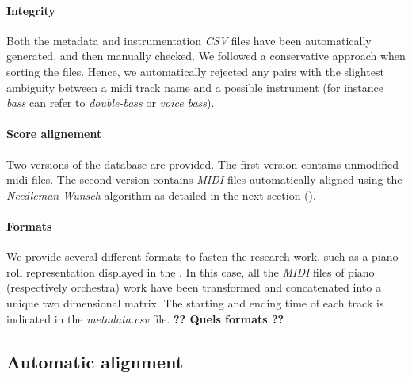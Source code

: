 \documentclass[twoside,twocolumn]{article}
\begin{document}
\paragraph{Integrity}
Both the metadata and instrumentation \textit{CSV} files have been automatically generated, and then manually checked. We followed a conservative approach when sorting the files. Hence, we automatically rejected any pairs with the slightest ambiguity between a midi track name and a possible instrument (for instance \textit{bass} can refer to \textit{double-bass} or \textit{voice bass}).

\paragraph{Score alignement}
Two versions of the database are provided. The first version contains unmodified midi files. The second version contains \textit{MIDI} files automatically aligned using the \textit{Needleman-Wunsch} \cite{NEEDLEMAN1970443} algorithm as detailed in the next section ().

\paragraph{Formats}
We provide several different formats to fasten the research work, such as a piano-roll representation displayed in the . In this case, all the \textit{MIDI} files of piano (respectively orchestra) work have been transformed and concatenated into a unique two dimensional matrix. The starting and ending time of each track is indicated in the \textit{metadata.csv} file.
\textbf{?? Quels formats ??}

\subsection{Automatic alignment}
\end{document}
